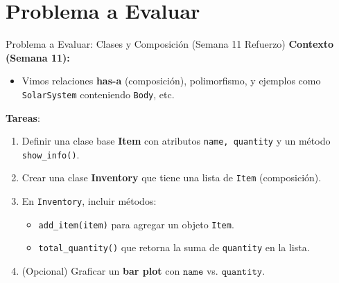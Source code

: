 \documentclass[10pt]{beamer}
\begin{document}
\section{Problema a Evaluar}

\begin{frame}{Problema a Evaluar: Clases y Composición (Semana 11 Refuerzo)}
  \textbf{Contexto (Semana 11):}  
  \begin{itemize}
    \item Vimos relaciones \textbf{has-a} (composición), polimorfismo, y ejemplos como \texttt{SolarSystem} conteniendo \texttt{Body}, etc.
  \end{itemize}

  \textbf{Tareas}:
  \begin{enumerate}
    \item Definir una clase base \textbf{Item} con atributos \texttt{name, quantity} y un método \texttt{show\_info()}.
    \item Crear una clase \textbf{Inventory} que tiene una lista de \texttt{Item} (composición).
    \item En \texttt{Inventory}, incluir métodos:
      \begin{itemize}
        \item \texttt{add\_item(item)} para agregar un objeto \texttt{Item}.
        \item \texttt{total\_quantity()} que retorna la suma de \texttt{quantity} en la lista.
      \end{itemize}
    \item (Opcional) Graficar un \textbf{bar plot} con \(\texttt{name}\) vs. \(\texttt{quantity}\).
  \end{enumerate}
\end{frame}
\end{document}
